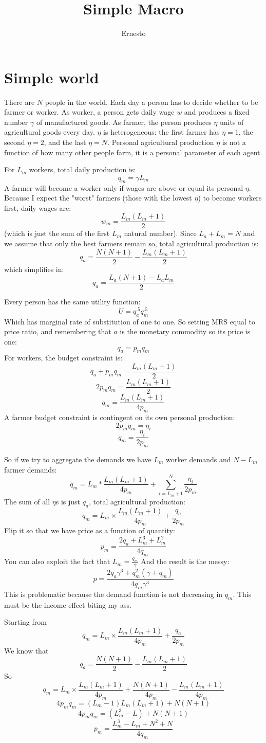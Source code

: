 \documentclass[]{article}
\title{Simple Macro}
\author{Ernesto}
\begin{document}
\maketitle

\section{Simple world}
There are $N$ people in the world. Each day a person has to decide whether to be farmer or worker.  
As worker, a person gets daily wage $w$ and produces a fixed number $\gamma$ of manufactured goods. 
As farmer, the person produces $\eta$ units of agricultural goods every day.
$\eta$ is heterogeneous: the first farmer has $\eta=1$, the second $\eta=2$, and the last $\eta = N$. Personal agricultural production $\eta$ is not a function of how many other people farm, it is a personal parameter of each agent.


For $L_m$ workers, total daily production is:
\[ q_m = \gamma L_m \]
A farmer will become a worker only if wages are above or equal its personal $\eta$. 
Because I expect the "worst" farmers (those with the lowest $\eta$) to become workers first, daily wages are:
\[ w_m = \frac{L_m(L_m+1)}{2}\]
(which is just the sum of the first $L_m$ natural number).
Since $L_a+L_m=N$ and we assume that only the best farmers remain so, total agricultural production is:
\[ q_a =  \frac{N(N+1)}{2} - \frac{L_m(L_m+1)}{2} \]
which simplifies in:
\[q_a = \frac{L_a(N+1) -L_aL_m}{2} \]

Every person has the same utility function:
\[ U = q_a^{.5}q_m^{.5} \]
Which has marginal rate of substitution of one to one.
So setting MRS equal to price ratio, and remembering that $a$ is the monetary commodity so its price is one:
\[ q_a = p_m q_m \]
For workers, the budget constraint is:
\[ q_a + p_m q_m = \frac{L_m(L_m+1)}{2}  \]
\[ 2 p_m q_m = \frac{L_m(L_m+1)}{2}  \]
\[ q_m = \frac{L_m(L_m+1)}{4 p_m}  \]
A farmer budget constraint is contingent on its own personal production:
\[ 2 p_m q_m = \eta_i \]
\[ q_m = \frac{\eta_i}{2 p_m} \]

So if we try to aggregate the demands we have $L_m$ worker demands and $N-L_m$ farmer demands:
\[ q_m = L_m * \frac{L_m(L_m+1)}{4 p_m} + \sum_{i=L_m+1}^N \frac{\eta_i}{2 p_m}  \]
The sum of all $\eta$s is just $q_a$, total agricultural production:
\[q_m = L_m \times \frac{L_m(L_m+1)}{4 p_m} +  \frac{q_a}{2 p_m} \]
Flip it so that we have price as a function of quantity:
\[ p_m = \frac{2 q_a + L_m^3 +L_m^2 }{4 q_m}\]
You can also exploit the fact that $L_m = \frac{q_m}{\gamma}$
And the result is the messy:
\[ p = \frac{2 q_a \gamma^3 + q_m^2 (\gamma + q_m)}{4 q_m \gamma^3} \]
This is problematic because the demand function is not decreasing in $q_m$. This must be the income effect biting my ass.

Starting from 
\[q_m = L_m \times \frac{L_m(L_m+1)}{4 p_m} +  \frac{q_a}{2 p_m} \]
We know that 
\[ q_a =  \frac{N(N+1)}{2} - \frac{L_m(L_m+1)}{2} \]
So
\[q_m = L_m \times \frac{L_m(L_m+1)}{4 p_m} +  \frac{N(N+1)}{4 p_m} - \frac{L_m(L_m+1)}{4 p_m}  \]
\[ 4 p_m q_m = (L_m-1)L_m(L_m+1) + N(N+1) \]
\[ 4 p_m q_m = (L_m^3-L) + N(N+1) \]
\[ p_m = \frac{L_m^3-L_m + N^2 + N}{4 q_m} \]
\end{document}
